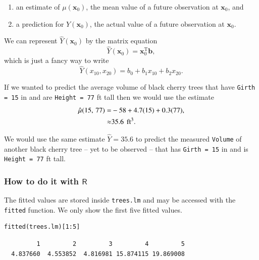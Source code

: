 \documentclass[captions=tableheading]{scrbook}
\begin{document}
\begin{enumerate}
\item an estimate of \(\mu(\mathbf{x}_{0})\), the mean value of a future observation at \(\mathbf{x}_{0}\), and
\item a prediction for \(Y(\mathbf{x}_{0})\), the actual value of a future observation at \(\mathbf{x}_{0}\).
\end{enumerate}

We can represent \(\hat{Y}(\mathbf{x}_{0})\) by the matrix equation
\begin{equation}
\hat{Y}(\mathbf{x}_{0})=\mathbf{x}_{0}^{\mathrm{T}}\mathbf{b},\label{eq-mlr-single-yhat-matrix}
\end{equation}
which is just a fancy way to write
\begin{equation}
\hat{Y}(x_{10},x_{20})=b_{0}+b_{1}x_{10}+b_{2}x_{20}.
\end{equation}
 
\begin{example}
If we wanted to predict the average volume of black cherry trees that have \texttt{Girth = 15} in and are \texttt{Height = 77} ft tall then we would use the estimate 
\begin{alignat*}{1}
\hat{\mu}(15,\,77)= & -58+4.7(15)+0.3(77),\\
\approx & 35.6\mbox{\,\ ft}^{3}.
\end{alignat*}

We would use the same estimate \(\hat{Y}=35.6\) to predict the measured \texttt{Volume} of another black cherry tree -- yet to be observed -- that has \texttt{Girth = 15} in and is \texttt{Height = 77} ft tall.
\end{example}
\subsubsection{How to do it with \(\mathsf{R}\)}
\label{sec-12-2-2-1}


The fitted values are stored inside \texttt{trees.lm} and may be accessed with the \texttt{fitted} function. We only show the first five fitted values.


\lstset{language=R}
\begin{lstlisting}
fitted(trees.lm)[1:5]
\end{lstlisting}

\begin{verbatim}
         1         2         3         4         5 
  4.837660  4.553852  4.816981 15.874115 19.869008
\end{verbatim}
\end{document}
